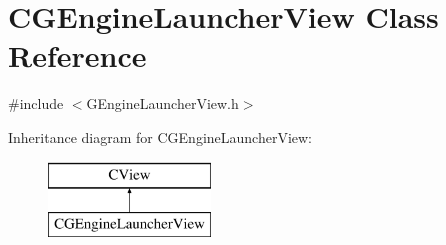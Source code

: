 \hypertarget{class_c_g_engine_launcher_view}{}\section{C\+G\+Engine\+Launcher\+View Class Reference}
\label{class_c_g_engine_launcher_view}


{\ttfamily \#include $<$G\+Engine\+Launcher\+View.\+h$>$}

Inheritance diagram for C\+G\+Engine\+Launcher\+View\+:\begin{figure}[H]
\begin{center}
\leavevmode
\includegraphics[height=2.000000cm]{class_c_g_engine_launcher_view}
\end{center}
\end{figure}
